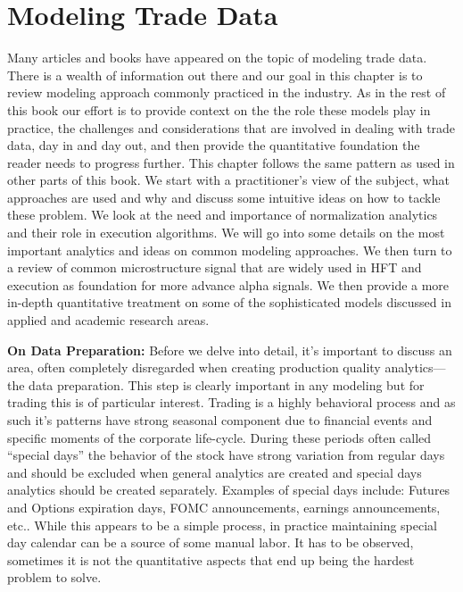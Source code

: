 \chapter{Modeling Trade Data \label{chap:ch_trade_data_models}}

Many articles and books have appeared on the topic of modeling trade data. There is a wealth of information out there and our goal in this chapter is to review modeling approach commonly practiced in the industry. As in the rest of this book our effort is to provide context on the the role these models play in practice, the challenges and considerations that are involved in dealing with trade data, day in and day out, and then provide the quantitative foundation the reader needs to progress further. This chapter follows the same pattern as used in other parts of this book. We start with a practitioner's view of the subject, what approaches are used  and why and discuss some intuitive ideas on how to tackle these problem. We look at the need and importance of normalization analytics and their role in execution algorithms. We will go into some details on the most important analytics and ideas on common modeling approaches. We then turn to a review of common microstructure signal that are widely used in HFT and execution as foundation for more advance alpha signals. We then provide a more in-depth quantitative treatment on some of the sophisticated models discussed in applied and academic research areas. \twomedskip


\noindent\textbf{On Data Preparation:} Before we delve into detail, it's important to discuss an area, often completely disregarded when creating production quality analytics---the data preparation. This step is clearly important in any modeling but for trading this is of particular interest. Trading is a highly behavioral process and as such it's patterns have strong seasonal component due to financial events and specific moments of the corporate life-cycle. During these periods often called ``special days'' the behavior of the stock have strong variation from regular days and should be excluded when general analytics are created and special days analytics should be created separately. Examples of special days include: Futures and Options expiration days, FOMC announcements, earnings announcements, etc.. While this appears to be a simple process, in practice maintaining special day calendar can be a source of some manual labor. It has to be observed, sometimes it is not the quantitative aspects that end up being the hardest problem to solve.



